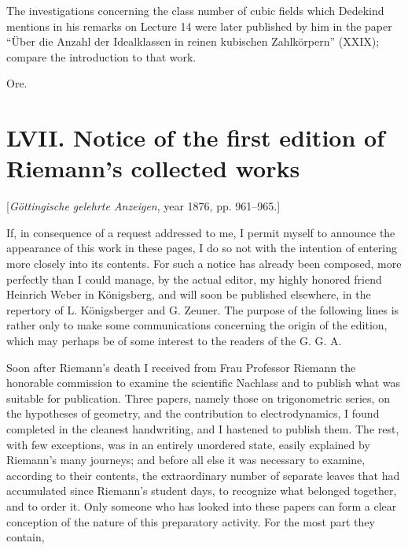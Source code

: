 \documentclass[11pt]{article}
\newcommand{\origpage}[1]{\par\vspace{0.25em}\noindent{\footnotesize\itshape [Printed page #1]}\par\vspace{0.25em}}
\begin{document}
The investigations concerning the class number of cubic fields which Dedekind mentions in his remarks on Lecture 14 were later published by him in the paper “Über die Anzahl der Idealklassen in reinen kubischen Zahlkörpern” (XXIX); compare the introduction to that work.

\begin{flushright}Ore.\end{flushright}

\origpage{421}
\section*{LVII. Notice of the first edition of Riemann's collected works}
\begin{center}\small [\textit{Göttingische gelehrte Anzeigen}, year 1876, pp. 961--965.]\end{center}

If, in consequence of a request addressed to me, I permit myself to announce the appearance of this work in these pages, I do so not with the intention of entering more closely into its contents. For such a notice has already been composed, more perfectly than I could manage, by the actual editor, my highly honored friend Heinrich Weber in Königsberg, and will soon be published elsewhere, in the repertory of L. Königsberger and G. Zeuner. The purpose of the following lines is rather only to make some communications concerning the origin of the edition, which may perhaps be of some interest to the readers of the G. G. A.

Soon after Riemann's death I received from Frau Professor Riemann the honorable commission to examine the scientific Nachlass and to publish what was suitable for publication. Three papers, namely those on trigonometric series, on the hypotheses of geometry, and the contribution to electrodynamics, I found completed in the cleanest handwriting, and I hastened to publish them. The rest, with few exceptions, was in an entirely unordered state, easily explained by Riemann's many journeys; and before all else it was necessary to examine, according to their contents, the extraordinary number of separate leaves that had accumulated since Riemann's student days, to recognize what belonged together, and to order it. Only someone who has looked into these papers can form a clear conception of the nature of this preparatory activity. For the most part they contain,
\end{document}
